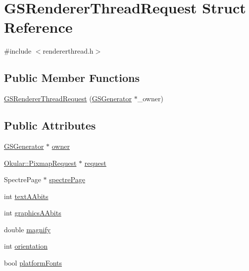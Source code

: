 \hypertarget{structGSRendererThreadRequest}{\section{G\+S\+Renderer\+Thread\+Request Struct Reference}
\label{structGSRendererThreadRequest}
}


{\ttfamily \#include $<$rendererthread.\+h$>$}

\subsection*{Public Member Functions}
\begin{DoxyCompactItemize}
\item 
\hyperlink{structGSRendererThreadRequest_a44b356a627d895a27d9e25a53da82ade}{G\+S\+Renderer\+Thread\+Request} (\hyperlink{classGSGenerator}{G\+S\+Generator} $\ast$\+\_\+owner)
\end{DoxyCompactItemize}
\subsection*{Public Attributes}
\begin{DoxyCompactItemize}
\item 
\hyperlink{classGSGenerator}{G\+S\+Generator} $\ast$ \hyperlink{structGSRendererThreadRequest_aec139828e53ddb30225c2581b1edd44a}{owner}
\item 
\hyperlink{classOkular_1_1PixmapRequest}{Okular\+::\+Pixmap\+Request} $\ast$ \hyperlink{structGSRendererThreadRequest_a3ab9d0e1f64e36467d659eeeb8e31cad}{request}
\item 
Spectre\+Page $\ast$ \hyperlink{structGSRendererThreadRequest_a267d15a82d942e6bde7e2d4a8467176e}{spectre\+Page}
\item 
int \hyperlink{structGSRendererThreadRequest_adef07f37b7a796c8b706b7a51edbad60}{text\+A\+Abits}
\item 
int \hyperlink{structGSRendererThreadRequest_a8b8cba2c375cb6dd0c8ba24c5b7af6ec}{graphics\+A\+Abits}
\item 
double \hyperlink{structGSRendererThreadRequest_a1bf244d777a5ae497126ee81e6b25cbf}{magnify}
\item 
int \hyperlink{structGSRendererThreadRequest_a1ba104a153a0665168543a77fdc5b061}{orientation}
\item 
bool \hyperlink{structGSRendererThreadRequest_a9efa8790f1c00a65572ae49ca3dd50aa}{platform\+Fonts}
\end{DoxyCompactItemize}


